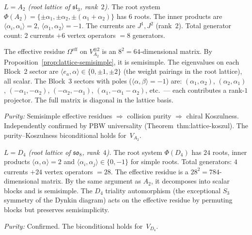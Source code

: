 \documentclass[11pt]{article}
\newcommand{\fsl}{\mathfrak{sl}}
\begin{document}
\begin{computation}
\label{comp:lattice-A2-D4}%
\emph{$L = A_2$ (root lattice of $\fsl_3$, rank~$2$).}
The root system $\Phi(A_2) = \{\pm\alpha_1, \pm\alpha_2,
\pm(\alpha_1+\alpha_2)\}$ has $6$ roots.  The inner products
are $\langle\alpha_i,\alpha_i\rangle = 2$,
$\langle\alpha_1,\alpha_2\rangle = -1$.
The currents are $J^1, J^2$ (rank~$2$).  Total generator count:
$2$ currents $+ 6$ vertex operators $= 8$ generators.

The effective residue $\Omega^{\mathrm{eff}}$ on
$V_{A_2}^{\otimes 2}$ is an $8^2 = 64$-dimensional matrix.
By Proposition~\ref{prop:lattice-semisimple}, it is semisimple.
The eigenvalues on each Block~2 sector are
$\langle e_a, \alpha\rangle \in \{0, \pm 1, \pm 2\}$
(the weight pairings in the root lattice), all scalar.
The Block~3 sectors with poles ($\langle\alpha,\beta\rangle = -1$)
are: $(\alpha_1, \alpha_2)$, $(\alpha_2, \alpha_1)$,
$(-\alpha_1, -\alpha_2)$, $(-\alpha_2, -\alpha_1)$,
$(\alpha_1, -\alpha_1-\alpha_2)$, etc.\ --- each contributes a
rank-$1$ projector.  The full matrix is diagonal in the lattice basis.

\emph{Purity:} Semisimple effective residues $\Longrightarrow$
collision purity $\Longrightarrow$ chiral Koszulness.
Independently confirmed by PBW universality
(Theorem~thm:lattice-koszul).
The purity--Koszulness biconditional holds for~$V_{A_2}$.

\smallskip\noindent
\emph{$L = D_4$ (root lattice of $\mathfrak{so}_8$, rank~$4$).}
The root system $\Phi(D_4)$ has $24$ roots,
inner products $\langle\alpha,\alpha\rangle = 2$ and
$\langle\alpha_i,\alpha_j\rangle \in \{0, -1\}$ for
simple roots.  Total generators: $4$ currents $+ 24$ vertex
operators $= 28$.  The effective residue is a $28^2 = 784$-dimensional
matrix.  By the same argument as $A_2$, it decomposes into scalar
blocks and is semisimple.  The $D_4$ triality automorphism
(the exceptional $S_3$ symmetry of the Dynkin diagram) acts on
the effective residue by permuting blocks but preserves
semisimplicity.

\emph{Purity:} Confirmed. The biconditional holds for~$V_{D_4}$.
\end{computation}
\end{document}
